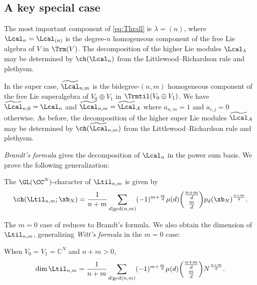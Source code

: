 \subsection{A key special case}
The most important component of \eqref{eq:Thrall} is $\lambda = (n)$, where $\Lcal_n = \Lcal_{(n)}$ is the degree-$n$ homogeneous component of the free Lie algebra of $V$ in $\Trm(V)$. The decomposition of the higher Lie modules $\Lcal_\lambda$ may be determined by $\ch(\Lcal_n)$ from the Littlewood--Richardson rule and plethysm.

In the super case, $\widetilde{\Lcal}_{n,m}$ is the bidegree-$(n,m)$ homogeneous component of the free Lie superalgebra of $V_0 \oplus V_1$ in $\Trmtil(V_0 \oplus V_1)$. We have $\widetilde{\Lcal}_{n,0} = \Lcal_n$ and $\widetilde{\Lcal}_{n,m} = \widetilde{\Lcal}_A$ where $a_{n,m}=1$ and $a_{i,j} = 0$ otherwise. As before, the decomposition of the higher super Lie modules $\widetilde{\Lcal}_A$ may be determined by $\ch(\widetilde{\Lcal}_{n,m})$ from the Littlewood--Richardson rule and plethysm.

\textit{Brandt's formula} \cite{Brandt} gives the decomposition of $\Lcal_n$ in the power sum basis. We prove the following generalization:
\begin{thm}\label{thm:super-brandt}
    The $\GL(\CC^N)$-character of $\Ltil_{n,m}$ is given by
    \begin{equation}
        \ch(\Ltil_{n,m}; \xb_N) = \frac{1}{n+m} \sum_{d \mid \gcd(n,m)} (-1)^{m + \frac{m}{d}} \mu(d) \binom{\frac{n+m}{d}}{\frac{m}{d}} p_d(\xb_N)^\frac{n+m}{d}.
    \end{equation}
\end{thm}
The $m=0$ case of  reduces to Brandt's formula. We also obtain the dimension of $\Ltil_{n, m}$, generalizing \textit{Witt's formula} \cite{Witt} in the $m=0$ case:

\begin{coro}\label{cor:super-Witt}
    When $V_0 = V_1 = \mathbb{C}^N$ and $n+m > 0$,
      \[ \dim \Ltil_{n,m} = \frac{1}{n+m} \sum_{d \mid \gcd(n, m)} (-1)^{m + \frac{m}{d}} \mu(d) \binom{\frac{n+m}{d}}{\frac{m}{d}} N^{\frac{n+m}{d}}. \]
\end{coro}

